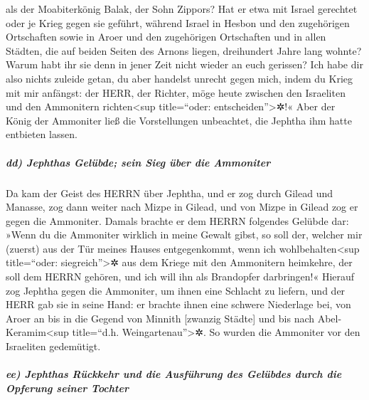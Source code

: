 als der Moabiterkönig Balak, der Sohn Zippors? Hat er etwa mit Israel
gerechtet oder je Krieg gegen sie geführt, während Israel
in Hesbon und den zugehörigen Ortschaften sowie in Aroer und den
zugehörigen Ortschaften und in allen Städten, die auf beiden Seiten des
Arnons liegen, dreihundert Jahre lang wohnte? Warum habt ihr sie denn in
jener Zeit nicht wieder an euch gerissen? Ich habe dir
also nichts zuleide getan, du aber handelst unrecht gegen mich, indem du
Krieg mit mir anfängst: der HERR, der Richter, möge heute zwischen den
Israeliten und den Ammonitern richten\textless sup title=``oder:
entscheiden''\textgreater✲!« Aber der König der Ammoniter
ließ die Vorstellungen unbeachtet, die Jephtha ihm hatte entbieten
lassen.

\hypertarget{dd-jephthas-geluxfcbde-sein-sieg-uxfcber-die-ammoniter}{%
\subparagraph{dd) Jephthas Gelübde; sein Sieg über die
Ammoniter}\label{dd-jephthas-geluxfcbde-sein-sieg-uxfcber-die-ammoniter}}

Da kam der Geist des HERRN über Jephtha, und er zog durch
Gilead und Manasse, zog dann weiter nach Mizpe in Gilead, und von Mizpe
in Gilead zog er gegen die Ammoniter. Damals brachte er
dem HERRN folgendes Gelübde dar: »Wenn du die Ammoniter wirklich in
meine Gewalt gibst, so soll der, welcher mir (zuerst) aus
der Tür meines Hauses entgegenkommt, wenn ich wohlbehalten\textless sup
title=``oder: siegreich''\textgreater✲ aus dem Kriege mit den Ammonitern
heimkehre, der soll dem HERRN gehören, und ich will ihn als Brandopfer
darbringen!« Hierauf zog Jephtha gegen die Ammoniter, um
ihnen eine Schlacht zu liefern, und der HERR gab sie in seine Hand:
er brachte ihnen eine schwere Niederlage bei, von Aroer
an bis in die Gegend von Minnith {[}zwanzig Städte{]} und bis nach
Abel-Keramim\textless sup title=``d.h. Weingartenau''\textgreater✲. So
wurden die Ammoniter vor den Israeliten gedemütigt.

\hypertarget{ee-jephthas-ruxfcckkehr-und-die-ausfuxfchrung-des-geluxfcbdes-durch-die-opferung-seiner-tochter}{%
\subparagraph{ee) Jephthas Rückkehr und die Ausführung des Gelübdes
durch die Opferung seiner
Tochter}\label{ee-jephthas-ruxfcckkehr-und-die-ausfuxfchrung-des-geluxfcbdes-durch-die-opferung-seiner-tochter}}

